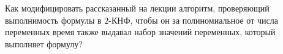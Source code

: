 Как модифицировать рассказанный на лекции алгоритм, проверяющий выполнимость формулы в $2$-КНФ, чтобы он за полиномиальное от
числа переменных время также выдавал набор значений переменных, который выполняет формулу?
